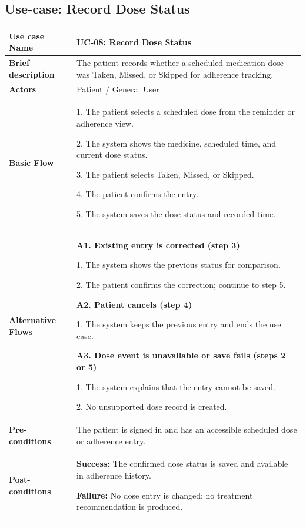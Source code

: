 \subsection{Use-case: Record Dose Status}
\label{uc:uc-08}
\begin{longtable}{|p{}|p{}|}
\hline
\textbf{Use case Name} & UC-08: Record Dose Status \\ \hline
\textbf{Brief description} & The patient records whether a scheduled medication dose was Taken, Missed, or Skipped for adherence tracking. \\ \hline
\textbf{Actors} & Patient / General User \\ \hline
\textbf{Basic Flow} &
1. The patient selects a scheduled dose from the reminder or adherence view.\par
2. The system shows the medicine, scheduled time, and current dose status.\par
3. The patient selects Taken, Missed, or Skipped.\par
4. The patient confirms the entry.\par
5. The system saves the dose status and recorded time.
\\ \hline
\textbf{Alternative Flows} &
\textbf{A1. Existing entry is corrected (step 3)}\par
1. The system shows the previous status for comparison.\par
2. The patient confirms the correction; continue to step 5.
\par\smallskip
\textbf{A2. Patient cancels (step 4)}\par
1. The system keeps the previous entry and ends the use case.
\par\smallskip
\textbf{A3. Dose event is unavailable or save fails (steps 2 or 5)}\par
1. The system explains that the entry cannot be saved.\par
2. No unsupported dose record is created.
\\ \hline
\textbf{Pre-conditions} & The patient is signed in and has an accessible scheduled dose or adherence entry. \\ \hline
\textbf{Post-conditions} & \textbf{Success:} The confirmed dose status is saved and available in adherence history.\par
\textbf{Failure:} No dose entry is changed; no treatment recommendation is produced. \\ \hline
\end{longtable}

